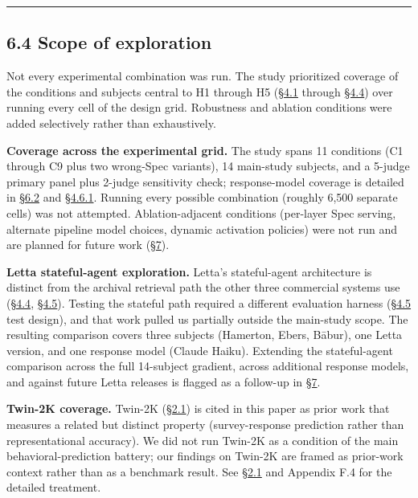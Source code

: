 \begin{center}\rule{0.5\linewidth}{0.5pt}\end{center}

\hypertarget{scope-of-exploration}{%
\subsection{6.4 Scope of exploration}\label{scope-of-exploration}}

Not every experimental combination was run. The study prioritized
coverage of the conditions and subjects central to H1 through H5 (\hyperref[the-cross-subject-gradient-and-its-per-question-mechanism]{§4.1}
through \hyperref[memory-system-composition]{§4.4}) over running every cell of the design grid. Robustness and
ablation conditions were added selectively rather than exhaustively.

\textbf{Coverage across the experimental grid.} The study spans 11
conditions (C1 through C9 plus two wrong-Spec variants), 14 main-study
subjects, and a 5-judge primary panel plus 2-judge sensitivity check;
response-model coverage is detailed in \hyperref[measurement-apparatus]{§6.2} and \hyperref[cross-provider-response-generation-tier-2-replication]{§4.6.1}. Running every
possible combination (roughly 6,500 separate cells) was not attempted.
Ablation-adjacent conditions (per-layer Spec serving, alternate pipeline
model choices, dynamic activation policies) were not run and are planned
for future work (\hyperref[future-work]{§7}).

\textbf{Letta stateful-agent exploration.} Letta's stateful-agent
architecture is distinct from the archival retrieval path the other
three commercial systems use (\hyperref[memory-system-composition]{§4.4}, \hyperref[exploratory-case-study-letta-stateful-agent-n3-post-hoc]{§4.5}). Testing the stateful path
required a different evaluation harness (\hyperref[exploratory-case-study-letta-stateful-agent-n3-post-hoc]{§4.5} test design), and that
work pulled us partially outside the main-study scope. The resulting
comparison covers three subjects (Hamerton, Ebers, Bābur), one Letta
version, and one response model (Claude Haiku). Extending the
stateful-agent comparison across the full 14-subject gradient, across
additional response models, and against future Letta releases is flagged
as a follow-up in \hyperref[future-work]{§7}.

\textbf{Twin-2K coverage.} Twin-2K (\hyperref[prior-measurement-targets-and-the-gap-representational-accuracy-fills]{§2.1}) is cited in this paper as
prior work that measures a related but distinct property
(survey-response prediction rather than representational accuracy). We
did not run Twin-2K as a condition of the main behavioral-prediction
battery; our findings on Twin-2K are framed as prior-work context rather
than as a benchmark result. See \hyperref[prior-measurement-targets-and-the-gap-representational-accuracy-fills]{§2.1} and Appendix F.4 for the detailed
treatment.

